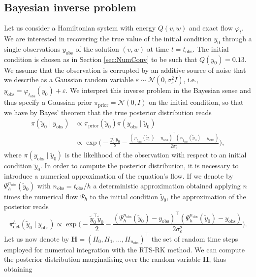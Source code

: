 \documentclass{siamart1116}
\numberwithin{theorem}{section}
\renewcommand{\phi}{\varphi}
\newcommand{\epl}{\varepsilon}
\begin{document}
\subsection{Bayesian inverse problem} Let us consider a Hamiltonian system with energy $Q(v,w)$ and exact flow $\phi_t$. We are interested in recovering the true value of the initial condition $y_0$ through a single observations $y_{\mathrm{obs}}$ of the solution $(v, w)$ at time $t = t_{\mathrm{obs}}$. The initial condition is chosen as in Section \ref{sec:NumConv} to be such that $Q(y_0) = 0.13$. We assume that the observation is corrupted by an additive source of noise that we describe as a Gaussian random variable $\epl \sim \mathcal{N}(0, \sigma_\epl^2 I)$, i.e., $y_{\mathrm{obs}} = \phi_{t_{\mathrm{obs}}}(y_0) + \epl$. We interpret this inverse problem in the Bayesian sense and thus specify a Gaussian prior $\pi_{\mathrm{prior}} = \mathcal{N}(0, I)$ on the initial condition, so that we have by Bayes' theorem that the true posterior distribution reads
\begin{equation}\label{eq:PosteriorExact}
\begin{aligned}
	\pi(\tilde y_0 \mid y_{\mathrm{obs}}) &\propto \pi_{\mathrm{prior}}(\tilde y_0) \pi(y_{\mathrm{obs}} \mid \tilde y_0)\\
	&\propto \exp\Big(-\frac{\tilde y_0^\top \tilde y_0}{2} -\frac{(\phi_{t_{\mathrm{obs}}}(\tilde y_0) - y_{\mathrm{obs}})^\top(\phi_{t_{\mathrm{obs}}}(\tilde y_0) - y_{\mathrm{obs}})}{2\sigma_\epl^2}\Big),
\end{aligned}
\end{equation}
where $\pi(y_{\mathrm{obs}} \mid \tilde y_0)$ is the likelihood of the observation with respect to an initial condition $\tilde y_0$. In order to compute the posterior distribution, it is necessary to introduce a numerical approximation of the equation's flow. If we denote by $\Psi_h^{n_{\mathrm{obs}}}(\tilde y_0)$ with $n_{\mathrm{obs}} = t_{\mathrm{obs}} / h$ a deterministic approximation obtained applying $n$ times the numerical flow $\Psi_h$ to the initial condition $\tilde y_0$, the approximation of the posterior reads
\begin{equation}\label{eq:PosteriorDet}
	\pi^h_{\mathrm{det}}(\tilde y_0 \mid y_{\mathrm{obs}}) \propto \exp\Big(-\frac{\tilde y_0^\top \tilde y_0}{2} -\frac{(\Psi_h^{n_{\mathrm{obs}}}(\tilde y_0) - y_{\mathrm{obs}})^\top(\Psi_h^{n_{\mathrm{obs}}}(\tilde y_0) - y_{\mathrm{obs}})}{2\sigma_\epl^2}\Big).
\end{equation}
Let us now denote by $\mathbf{H} = (H_0, H_1, \ldots, H_{n_\mathrm{obs}})^\top$ the set of random time steps employed for numerical integration with the RTS-RK method. We can compute the posterior distribution marginalising over the random variable $\mathbf{H}$, thus obtaining
\end{document}
